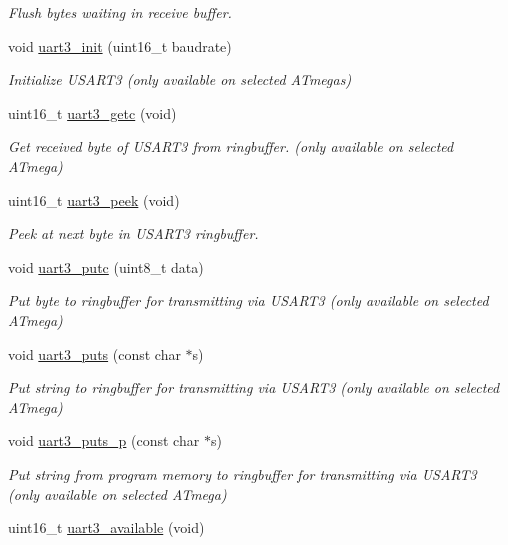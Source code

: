 \begin{DoxyCompactItemize}
\begin{DoxyCompactList}\small\item\em Flush bytes waiting in receive buffer. \end{DoxyCompactList}\item 
void \hyperlink{group__avr-uart_ga62087cd1974706879fd603f8e802c674}{uart3\-\_\-init} (uint16\-\_\-t baudrate)
\begin{DoxyCompactList}\small\item\em Initialize U\-S\-A\-R\-T3 (only available on selected A\-Tmegas) \end{DoxyCompactList}\item 
uint16\-\_\-t \hyperlink{group__avr-uart_ga8ac0106d2083bdd4ee9b1d80fae1b305}{uart3\-\_\-getc} (void)
\begin{DoxyCompactList}\small\item\em Get received byte of U\-S\-A\-R\-T3 from ringbuffer. (only available on selected A\-Tmega) \end{DoxyCompactList}\item 
\hypertarget{group__avr-uart_gaf022a2762a5237c23734d2433fb4a8dc}{uint16\-\_\-t \hyperlink{group__avr-uart_gaf022a2762a5237c23734d2433fb4a8dc}{uart3\-\_\-peek} (void)}\label{group__avr-uart_gaf022a2762a5237c23734d2433fb4a8dc}

\begin{DoxyCompactList}\small\item\em Peek at next byte in U\-S\-A\-R\-T3 ringbuffer. \end{DoxyCompactList}\item 
void \hyperlink{group__avr-uart_gaedb6deebd5dc189b7ab7a49b655eedd7}{uart3\-\_\-putc} (uint8\-\_\-t data)
\begin{DoxyCompactList}\small\item\em Put byte to ringbuffer for transmitting via U\-S\-A\-R\-T3 (only available on selected A\-Tmega) \end{DoxyCompactList}\item 
void \hyperlink{group__avr-uart_gaa7ea14ab43946a921d0da142d005ed56}{uart3\-\_\-puts} (const char $\ast$s)
\begin{DoxyCompactList}\small\item\em Put string to ringbuffer for transmitting via U\-S\-A\-R\-T3 (only available on selected A\-Tmega) \end{DoxyCompactList}\item 
void \hyperlink{group__avr-uart_gad7d9650ed5fa2929e840aace337a3476}{uart3\-\_\-puts\-\_\-p} (const char $\ast$s)
\begin{DoxyCompactList}\small\item\em Put string from program memory to ringbuffer for transmitting via U\-S\-A\-R\-T3 (only available on selected A\-Tmega) \end{DoxyCompactList}\item 
\hypertarget{group__avr-uart_ga66823fdca13c3b045bbfc4d61aa1225c}{uint16\-\_\-t \hyperlink{group__avr-uart_ga66823fdca13c3b045bbfc4d61aa1225c}{uart3\-\_\-available} (void)}\label{group__avr-uart_ga66823fdca13c3b045bbfc4d61aa1225c}


\end{DoxyCompactItemize}
